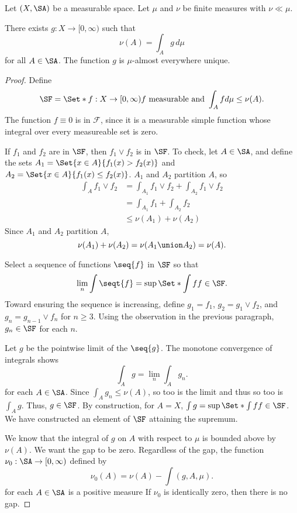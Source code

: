 \begin{prop}
Let $(X, \SA)$
be a measurable space.
Let $\mu$ and $\nu$
be finite measures
with $\nu \ll \mu$.

There exists
$g: X \to [0, \infty)$
such that
\[
  \nu(A) = \int_A g \, d\mu
\]
for all $A \in \SA$.
The function $g$ is $\mu$-almost
everywhere unique.
\begin{proof}
  Define
  \[
    \SF = \Set*{
      f: X \to [0, \infty)
    }{
      f \text{ measurable and }
      \int_A f d\mu \leq \nu(A)
    }.
  \]
  The function $f \equiv 0$ is in $\mathcal{F}$,
  since it is a measurable simple function
  whose integral over every measureable set
  is zero.

  If $f_1$ and $f_2$ are in $\SF$,
  then $f_1 \vee f_2$ is in $\SF$.
  To check, let $A \in \SA$,
  and define the sets
  $A_1 = \Set{x \in A}{f_1(x) > f_2(x)}$
  and
  $A_2 = \Set{x \in A}{f_1(x) \leq f_2(x)}$.
  $A_1$ and $A_2$ partition $A$, so
  \[
    \begin{aligned}
    \int_A f_1 \vee f_2
      &=    \int_{A_1} f_1 \vee f_2 + \int_{A_2} f_1 \vee f_2 \\
      &=    \int_{A_1} f_1  + \int_{A_2} f_2 \\
      &\leq \nu(A_1) + \nu(A_2)
    \end{aligned}
  \]
  Since $A_1$ and $A_2$ partition
  $A$,
  \[
    \nu(A_1) + \nu(A_2) =
    \nu(A_1 \union A_2) =
    \nu(A).
  \]

  Select a sequence of
  functions $\seq{f}$ in $\SF$
  so that
  $$
    \lim_{n} \int \seqt{f} =
    \sup\Set*{\int f}{f \in \SF}.
  $$
  Toward ensuring the sequence
  is increasing, define
  $g_1 = f_1$, $g_2 = g_1 \vee f_2$,
  and $g_n = g_{n-1} \vee f_n$
  for $n \geq 3$.
  Using the observation in the previous
  paragraph, $g_n \in \SF$ for each $n$.

  Let $g$ be the pointwise limit
  of the $\seq{g}$.
  The monotone convergence
  of integrals shows
  \[
    \int_A g = \lim_n \int_A g_n.
  \]
  for each $A \in \SA$.
  Since $\int_A g_n \leq \nu(A)$,
  so too is the limit and thus
  so too is $\int_A g$.
  Thus, $g \in \SF$.
  By construction,
  for $A = X$,
  $\int g = \sup\Set*{\int f}{f \in \SF}$.
  We have constructed an element of $\SF$
  attaining the supremum.

  We know that the integral of
  $g$ on $A$ with respect to $\mu$
  is bounded above by $\nu(A)$.
  We want the gap to be zero.
  Regardless of the gap, the function
  $\nu_0: \SA \to [0, \infty)$ defined
  by
  \[
    \nu_0(A) = \nu(A) - \int(g, A, \mu).
  \]
  for each $A \in \SA$ is a positive measure
  If $\nu_0$ is identically zero,
  then there is no gap.


\end{proof}
\end{prop}
